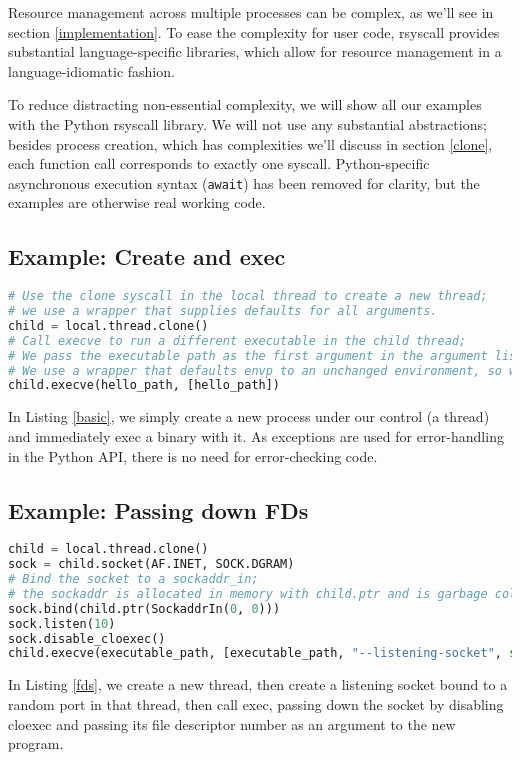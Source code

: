 \documentclass{acmart}
\begin{document}
Resource management across multiple processes can be complex,
as we'll see in section \ref{implementation}.
To ease the complexity for user code,
rsyscall provides substantial language-specific libraries,
which allow for resource management in a language-idiomatic fashion.

To reduce distracting non-essential complexity,
we will show all our examples with the Python rsyscall library.
We will not use any substantial abstractions;
besides process creation, which has complexities we'll discuss in section \ref{clone},
each function call corresponds to exactly one syscall.
Python-specific asynchronous execution syntax (\texttt{await}) has been removed for clarity,
but the examples are otherwise real working code.

\subsection{Example: Create and exec}
\begin{lstlisting}[float,language=Python,label={basic},caption={Creating a new process and immediately execing}]
# Use the clone syscall in the local thread to create a new thread;
# we use a wrapper that supplies defaults for all arguments.
child = local.thread.clone()
# Call execve to run a different executable in the child thread;
# We pass the executable path as the first argument in the argument list, as is traditional.
# We use a wrapper that defaults envp to an unchanged environment, so we don't pass envp.
child.execve(hello_path, [hello_path])
\end{lstlisting}
In Listing \ref{basic}, we simply create a new process under our control (a thread)
and immediately exec a binary with it.
As exceptions are used for error-handling in the Python API,
there is no need for error-checking code.
\subsection{Example: Passing down FDs}
\begin{lstlisting}[float,language=Python,label={fds},caption={Passing down FDs}]
child = local.thread.clone()
sock = child.socket(AF.INET, SOCK.DGRAM)
# Bind the socket to a sockaddr_in;
# the sockaddr is allocated in memory with child.ptr and is garbage collected.
sock.bind(child.ptr(SockaddrIn(0, 0)))
sock.listen(10)
sock.disable_cloexec()
child.execve(executable_path, [executable_path, "--listening-socket", str(int(sock))])
\end{lstlisting}
In Listing \ref{fds}, we create a new thread,
then create a listening socket bound to a random port in that thread,
then call exec, 
passing down the socket by disabling cloexec and passing its file descriptor number as an argument to the new program.
\end{document}
